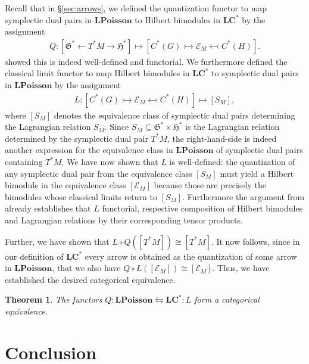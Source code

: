 \documentclass[sn-mathphys,Numbered]{sn-jnl}
\newtheorem{theorem}{Theorem}%
\begin{document}
Recall that in \S\ref{sec:arrows}, we defined the quantization functor to map symplectic dual pairs in $\mathbf{LPoisson}$ to Hilbert bimodules in $\mathbf{LC^*}$ by the assignment
\begin{align}
    Q: [\mathfrak{G}^*\leftarrow T^*M\rightarrow \mathfrak{H}^*]\mapsto [C^*(G)\rightarrowtail \mathcal{E}_M\leftarrowtail C^*(H)].
\end{align}
\citet{La01a} showed this is indeed well-defined and functorial.  We furthermore defined the classical limit functor to map Hilbert bimodules in $\mathbf{LC^*}$ to symplectic dual pairs in $\mathbf{LPoisson}$ by the assignment
\begin{align}
    L: [C^*(G)\rightarrowtail \mathcal{E}_M\leftarrowtail C^*(H)]\mapsto [S_M],
\end{align}
where $[S_M]$ denotes the equivalence class of symplectic dual pairs determining the Lagrangian relation $S_M$.
Since $S_M\subseteq \mathfrak{G}^*\times\mathfrak{H}^*$ is the Lagrangian relation determined by the symplectic dual pair $T^*M$, the right-hand-side is indeed another expression for the equivalence class in $\mathbf{LPoisson}$ of symplectic dual pairs containing $T^*M$.
We have now shown that $L$ is well-defined: the quantization of any symplectic dual pair from the equivalence class $[S_M]$ must yield a Hilbert bimodule in the equivalence class $[\mathcal{E}_M]$ because those are precisely the bimodules whose classical limits return to $[S_M]$.  Furthermore the argument from \citet{FeSt24} already establishes that $L$ functorial, respective composition of Hilbert bimodules and Lagrangian relations by their corresponding tensor products.

Further, we have shown that $L\circ Q\left([T^*M]\right)\cong [T^*M]$.  It now follows, since in our definition of $\mathbf{LC^*}$ every arrow is obtained as the quantization of some arrow in $\mathbf{LPoisson}$, that we also have $Q\circ L\left([\mathcal{E}_M]\right)\cong [\mathcal{E}_M]$.  Thus, we have established the desired categorical equivalence.\bigskip

\begin{theorem}
    The functors $Q:\mathbf{LPoisson}\leftrightarrows\mathbf{LC^*}: L$ form a categorical equivalence.
\end{theorem}


\section{Conclusion}
\label{sec:con}
\end{document}

